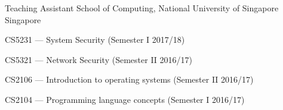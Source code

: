 


\begin{cventries}
  \cventry
    {Teaching Assistant} %
    {School of Computing, National University of Singapore} %
    {Singapore} %
    {}
    {
      \begin{cvitems} %
        \item CS5231 --- System Security (Semester I 2017/18)
        \item CS5321 --- Network Security (Semester II 2016/17)
        \item CS2106 --- Introduction to operating systems (Semester II 2016/17)
        \item CS2104 --- Programming language concepts (Semester I 2016/17)
      \end{cvitems}
    }




\end{cventries}
